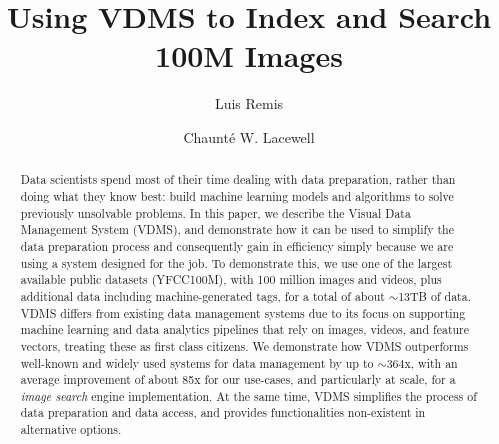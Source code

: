 \documentclass[sigconf, nonacm]{acmart}
\begin{document}
\title{Using VDMS to Index and Search 100M Images}

\author{Luis Remis}

\author{Chaunt\'e W. Lacewell}

\begin{abstract}
Data scientists spend most of their time dealing with data preparation,
rather than doing what they know best:
build machine learning models and algorithms to solve previously unsolvable problems.
In this paper, we describe the Visual Data Management System (VDMS),
and demonstrate how it can be used to simplify the data preparation process
and consequently gain in efficiency simply because
we are using a system designed for the job.
To demonstrate this, we use one of the largest available
public datasets (YFCC100M),
with 100 million images and videos, plus additional data including
machine-generated tags, for a total of about $\sim$13TB of data.
VDMS differs from existing data management systems
due to its focus on supporting machine learning and
data analytics pipelines that rely on images, videos, and feature vectors,
treating these as first class citizens.
We demonstrate how VDMS outperforms well-known and widely used
systems for data management by up to $\sim$364x, with
an average improvement of about 85x for our use-cases, and particularly at scale,
for a \textit{image search} engine implementation.
At the same time, VDMS simplifies the process of data preparation and data access,
and provides functionalities non-existent in alternative options.
\end{abstract}

\maketitle
\end{document}
